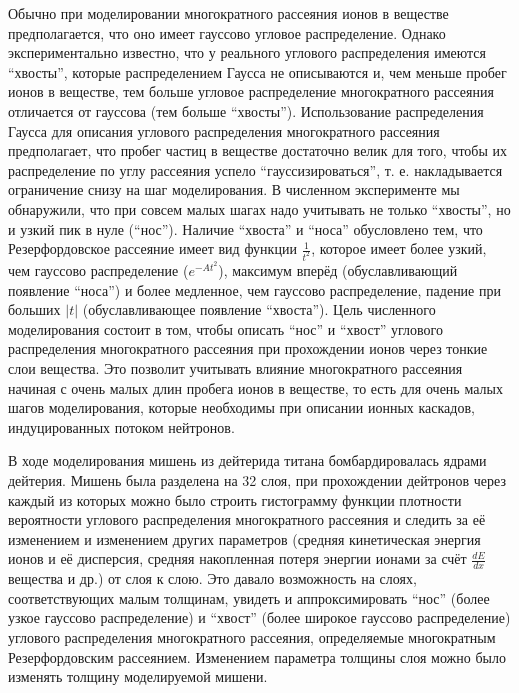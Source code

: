 \documentclass[a4paper,12pt]{article}
\begin{document}
\begin{large}
  Обычно при моделировании многократного рассеяния ионов в веществе предполагается, что оно имеет гауссово угловое распределение.
  Однако экспериментально известно, что у реального углового распределения имеются ``хвосты'', которые распределением Гаусса не описываются и, чем меньше пробег ионов в веществе, тем больше угловое распределение многократного рассеяния отличается от гауссова (тем больше ``хвосты'').
  Использование распределения Гаусса для описания углового распределения многократного рассеяния предполагает, что пробег частиц в веществе достаточно велик для того, чтобы их распределение по углу рассеяния успело ``гауссизироваться'', т. е. накладывается ограничение снизу на шаг моделирования.
  В численном эксперименте мы обнаружили, что при совсем малых шагах надо учитывать не только ``хвосты'', но и узкий пик в нуле (``нос'').
  Наличие ``хвоста'' и ``носа'' обусловлено тем, что Резерфордовское рассеяние имеет вид функции $\frac{1}{t^2}$, которое имеет более узкий, чем гауссово распределение ($e^{-At^2}$), максимум вперёд (обуславливающий появление ``носа'') и более медленное, чем гауссово распределение, падение при больших $|t|$ (обуславливающее появление ``хвоста'').
  Цель численного моделирования состоит в том, чтобы описать ``нос'' и ``хвост'' углового распределения многократного рассеяния при прохождении ионов через тонкие слои вещества.
  Это позволит учитывать влияние многократного рассеяния начиная с очень малых длин пробега ионов в веществе, то есть для очень малых шагов моделирования, которые необходимы при описании ионных каскадов, индуцированных потоком нейтронов.

  В ходе моделирования мишень из дейтерида титана бомбардировалась ядрами дейтерия.
  Мишень была разделена на 32 слоя, при прохождении дейтронов через каждый из которых можно было строить гистограмму функции плотности вероятности углового распределения многократного рассеяния и следить за её изменением и изменением других параметров (средняя кинетическая энергия ионов и её дисперсия, средняя накопленная потеря энергии ионами за счёт $\frac{dE}{dx}$ вещества и др.) от слоя к слою.
  Это давало возможность на слоях, соответствующих малым толщинам, увидеть и аппроксимировать ``нос'' (более узкое гауссово распределение) и ``хвост'' (более широкое гауссово распределение) углового распределения многократного рассеяния, определяемые многократным Резерфордовским рассеянием.
  Изменением параметра толщины слоя можно было изменять толщину моделируемой мишени. 


\end{large}
\end{document}
